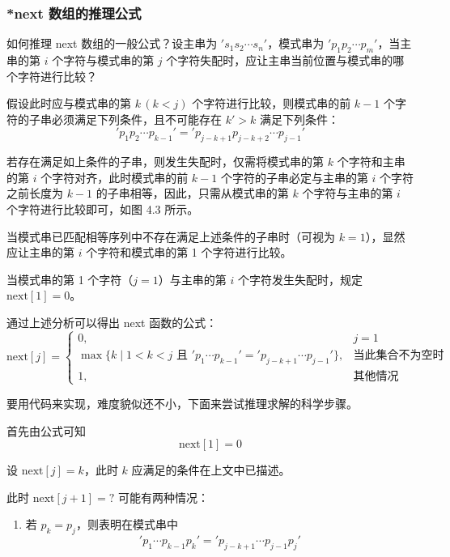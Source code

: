 \documentclass[UTF8]{ctexart}
\begin{document}
	
	\subsubsection{*next 数组的推理公式}
	如何推理 next 数组的一般公式？设主串为 \( 's_1 s_2 \cdots s_n' \)，模式串为 \( 'p_1 p_2 \cdots p_m' \)，当主串的第 \( i \) 个字符与模式串的第 \( j \) 个字符失配时，应让主串当前位置与模式串的哪个字符进行比较？  
	
	假设此时应与模式串的第 \( k \, (k < j) \) 个字符进行比较，则模式串的前 \( k - 1 \) 个字符的子串必须满足下列条件，且不可能存在 \( k' > k \) 满足下列条件：  
	\[ 'p_1 p_2 \cdots p_{k-1}' = 'p_{j-k+1} p_{j-k+2} \cdots p_{j-1}' \]  
	
	
	若存在满足如上条件的子串，则发生失配时，仅需将模式串的第 \( k \) 个字符和主串的第 \( i \) 个字符对齐，此时模式串的前 \( k - 1 \) 个字符的子串必定与主串的第 \( i \) 个字符之前长度为 \( k - 1 \) 的子串相等，因此，只需从模式串的第 \( k \) 个字符与主串的第 \( i \) 个字符进行比较即可，如图 4.3 所示。
	
	
	
	
	当模式串已匹配相等序列中不存在满足上述条件的子串时（可视为 \( k = 1 \)），显然应让主串的第 \( i \) 个字符和模式串的第 1 个字符进行比较。  
	
	当模式串的第 1 个字符（\( j = 1 \)）与主串的第 \( i \) 个字符发生失配时，规定 \( \text{next}[1] = 0 \)。  
	
	
	通过上述分析可以得出 next 函数的公式：  
	\[
	\text{next}[j] = 
	\begin{cases} 
		0, & j = 1 \\[4pt]
		\max\big\{ k \mid 1 < k < j \text{ 且 } 'p_1 \cdots p_{k-1}' = 'p_{j-k+1} \cdots p_{j-1}' \big\}, & \text{当此集合不为空时} \\[4pt]
		1, & \text{其他情况} 
	\end{cases}
	\]  
	
	
	要用代码来实现，难度貌似还不小，下面来尝试推理求解的科学步骤。  
	
	首先由公式可知  
	\[ \text{next}[1] = 0 \]  
	
	设 \( \text{next}[j] = k \)，此时 \( k \) 应满足的条件在上文中已描述。  
	
	此时 \( \text{next}[j + 1] = ? \) 可能有两种情况：  
	
	\begin{enumerate}
		\item 若 \( p_k = p_j \)，则表明在模式串中  
		\[ 'p_1 \cdots p_{k-1} p_k' = 'p_{j-k+1} \cdots p_{j-1} p_j' \]  
	\end{enumerate}  
	
	
\end{document}
